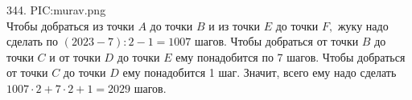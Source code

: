 344. {{PIC:murav.png}}\\
Чтобы добраться из точки $A$ до точки $B$ и из точки $E$ до точки $F,$ жуку надо сделать по $(2023-7):2-1=1007$ шагов. Чтобы добраться от точки $B$ до точки $C$ и от точки $D$ до точки $E$ ему понадобится по 7 шагов. Чтобы добраться от точки $C$ до точки $D$ ему понадобится 1 шаг. Значит, всего ему надо сделать $1007\cdot2+7\cdot2+1=2029$ шагов.\\
